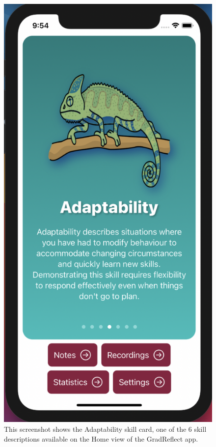 \documentclass{l4proj}
\begin{document}
\begin{figure}
    \centering
    \includegraphics[scale=0.3]{images/AdaptabilitySkillCard.pdf}    
    \caption{This screenshot shows the Adaptability skill card, one of the 6 skill descriptions available on the Home view of the GradReflect app.}
    \label{fig:AdaptabilitySkillCard} 
\end{figure}
\end{document}
